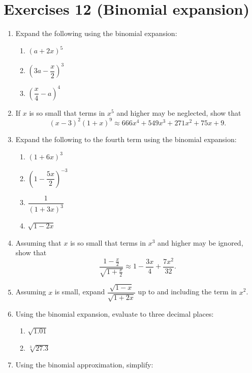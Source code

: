 \documentclass[
  english,
  12pt,
  oneside]{book}
\providecommand{\tightlist}{%
  \setlength{\itemsep}{0pt}\setlength{\parskip}{0pt}}
\theoremstyle{definition}
\theoremstyle{definition}
\theoremstyle{definition}
\theoremstyle{definition}
\theoremstyle{remark}
\begin{document}
\chapter*{Exercises 12 (Binomial expansion)}\label{exercises-12-binomial-expansion}

\begin{enumerate}
\def\labelenumi{\arabic{enumi}.}
\item
  Expand the following using the binomial expansion:

  \begin{enumerate}
  \def\labelenumii{\roman{enumii})}
  \tightlist
  \item
    \((a+2x)^5\)
  \item
    \(\left(3a-\dfrac{x}{2}\right)^3\)
  \item
    \(\left(\dfrac{x}{4}-a\right)^4\)
  \end{enumerate}
\item
  If \(x\) is so small that terms in \(x^5\) and higher may be neglected, show that
  \[(x - 3)^2(1 + x)^9 \approx 666x^4 + 549x^3 + 271x^2 + 75x + 9.\]
\item
  Expand the following to the fourth term using the binomial expansion:

  \begin{enumerate}
  \def\labelenumii{\roman{enumii})}
  \tightlist
  \item
    \((1+6x)^3\)
  \item
    \(\left(1-\dfrac{5x}{2}\right)^{-3}\)
  \item
    \(\dfrac{1}{(1+3x)^3}\)
  \item
    \(\sqrt{1-2x}\)
  \end{enumerate}
\item
  Assuming that \(x\) is so small that terms in \(x^3\) and higher may be ignored, show that
  \[\frac{1-\frac{x}{2}}{\sqrt{1+\frac{x}{2}}}\approx 1-\frac{3x}{4}+\frac{7x^2}{32}.\]
\item
  Assuming \(x\) is small, expand \(\dfrac{\sqrt{1-x}}{\sqrt{1+2x}}\) up to and including the term in \(x^2\).
\item
  Using the binomial expansion, evaluate to three decimal places:

  \begin{enumerate}
  \def\labelenumii{\roman{enumii})}
  \tightlist
  \item
    \(\sqrt{1.01}\)
  \item
    \(\sqrt[3]{27.3}\)
  \end{enumerate}
\item
  Using the binomial approximation, simplify:


\end{enumerate}
\end{document}
